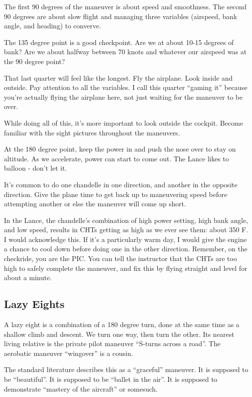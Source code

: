 The first 90 degrees of the maneuver is about speed and smoothness. The second 90 degrees are about slow flight and managing three variables (airspeed, bank angle, and heading) to converve.

The 135 degree point is a good checkpoint. Are we at about 10-15 degrees of bank? Are we about halfway between 70 knots and whatever our airspeed was at the 90 degree point?

That last quarter will feel like the longest. Fly the airplane. Look inside and outside. Pay attention to all the variables. I call this quarter ``gaming it'' because you're actually flying the airplane here, not just waiting for the maneuver to be over.

While doing all of this, it's more important to look outside the cockpit. Become familiar with the sight pictures throughout the maneuvers.

At the 180 degree point, keep the power in and push the nose over to stay on altitude. As we accelerate, power can start to come out. The Lance likes to balloon - don't let it.

It's common to do one chandelle in one direction, and another in the opposite direction. Give the plane time to get back up to maneuvering speed before attempting another or else the maneuver will come up short.

In the Lance, the chandelle's combination of high power setting, high bank angle, and low speed, results in CHTs getting as high as we ever see them: about 350 F. I would acknowledge this. If it's a particularly warm day, I would give the engine a chance to cool down before doing one in the other direction. Remember, on the checkride, you are the PIC. You can tell the instructor that the CHTs are too high to safely complete the maneuver, and fix this by flying straight and level for about a minute.

\subsection{Lazy Eights}

A lazy eight is a combination of a 180 degree turn, done at the same time as a shallow climb and descent. We turn one way, then turn the other. Its nearest living relative is the private pilot maneuver ``S-turns across a road''. The aerobatic maneuver ``wingover'' is a cousin.

The standard literature describes this as a ``graceful'' maneuver. It is supposed to be ``beautiful''. It is supposed to be ``ballet in the air''. It is supposed to demonstrate ``mastery of the aircraft'' or somesuch.

